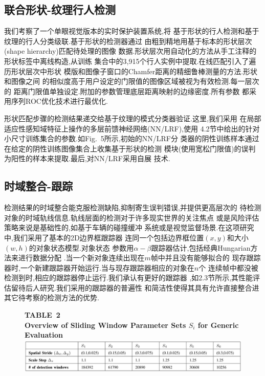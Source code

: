 \documentclass[10pt,letterpaper,journal,compsoc]{IEEEtran}
\begin{document}
\subsection{联合形状-纹理行人检测}
我们考察了一个单眼视觉版本的实时保护装置系统\cite{bib23},将
基于形状的行人检测和基于纹理的行人分类级联.基于形状的检测器通过
由粗到精地用基于标本的形状层次(shape hierarchy)匹配待处理的图像
数据.形状层次用自动化的方法从手工注释的形状标签中离线构造,从训练
集合中的3,915个行人实例中提取.在线匹配引入了遍历形状层次中形状
模版和图像子窗口的Chamfer距离的精细鲁棒测量的方法.形状和图像之间
的相似度高于用户设定的门限值的图像区域被视为有效检测.每一层次的
距离门限值单独设定.附加的参数管理底层距离映射的边缘密度.所有参数
都采用序列ROC优化技术\cite{bib23}进行最优化.

形状匹配步骤的检测结果递交给基于纹理的模式分类器验证.这里,我们采用
在局部适应性感知域特征上操作的多层前馈神经网络(NN/LRF),使用
4.2节中给出的针对小尺寸训练集合的参数.如Fig.~5所示,初始的NN/LRF分
类器的阴性训练样本通过在给定的阴性训练图像集合上收集基于形状的检测
模块(使用宽松门限值)的误判为阳性的样本来提取.最后,对NN/LRF采用自展
技术.


\subsection{时域整合-跟踪}
检测结果的时域整合能克服检测缺陷,抑制寄生误判错误,并提供更高层次的
待检测对象的时域轨线信息.轨线层面的检测对于许多现实世界的关注焦点
或是风险评估策略来说是基础性的,如基于车辆的碰撞缓冲
系统或是视觉监督场景.在这项研究中,我们采用了基本的2D边界框跟踪器
连同一个包括边界框位置$(x,y)$和大小$(w,h)$的对象状态模型.对象状态
参数用$\alpha-\beta$跟踪器估计,包括经典Hungarian方法来进行数据分配
\cite{bib37}.当一个新对象连续出现在$m$帧中并且没有能够拟合的
现存跟踪器时,一个新建跟踪器开始运行.当与现存跟踪器相应的对象在$n$个
连续帧中都没被检测到时,相应的跟踪器停止运行.我们承认有更好的跟踪器
,如2.3节所示,其性能评估留待后人研究.我们采用的跟踪器的普遍性
和简洁性使得其具有允许直接整合进其它待考察的检测方法的优势.
\begin{figure}[!b]
\centering
\large{\textbf{TABLE~2\\
Overview of Sliding Window Parameter Sets $S_i$ for Generic Evaluation
}}
\includegraphics[width=7in]{table2.JPG}
\end{figure}
\end{document}
